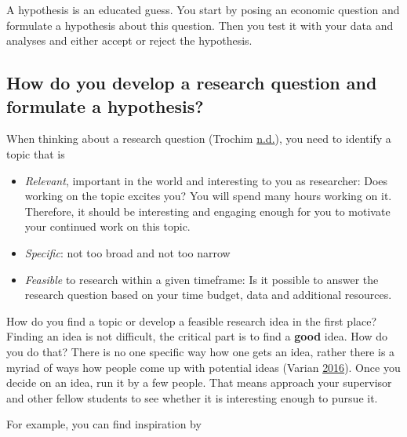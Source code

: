 \documentclass[
]{book}
\providecommand{\tightlist}{%
  \setlength{\itemsep}{0pt}\setlength{\parskip}{0pt}}
\begin{document}
A hypothesis is an educated guess. You start by posing an economic
question and formulate a hypothesis about this question. Then you test
it with your data and analyses and either accept or reject the
hypothesis.

\hypertarget{how-do-you-develop-a-research-question-and-formulate-a-hypothesis}{%
\subsection{How do you develop a research question and formulate a
hypothesis?}\label{how-do-you-develop-a-research-question-and-formulate-a-hypothesis}}

When thinking about a research question (Trochim
\protect\hyperlink{ref-trochim_problem_nodate}{n.d.}), you need to
identify a topic that is

\begin{itemize}
\tightlist
\item
  \emph{Relevant}, important in the world and interesting to you as
  researcher: Does working on the topic excites you? You will spend many
  hours working on it. Therefore, it should be interesting and engaging
  enough for you to motivate your continued work on this topic.
\item
  \emph{Specific}: not too broad and not too narrow
\item
  \emph{Feasible} to research within a given timeframe: Is it possible
  to answer the research question based on your time budget, data and
  additional resources.
\end{itemize}

How do you find a topic or develop a feasible research idea in the first
place? Finding an idea is not difficult, the critical part is to find a
\textbf{good} idea. How do you do that? There is no one specific way how
one gets an idea, rather there is a myriad of ways how people come up
with potential ideas (Varian
\protect\hyperlink{ref-varian_how_2016}{2016}). Once you decide on an
idea, run it by a few people. That means approach your supervisor and
other fellow students to see whether it is interesting enough to pursue
it.

For example, you can find inspiration by
\end{document}
